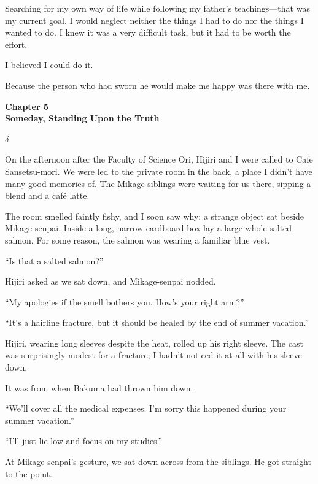 \documentclass[
    a4paper,
    12pt,
    twoside,
    openany,
    UTF8,
    fontset=windows
]{ctexbook}
\begin{document}
Searching for my own way of life while following my father's teachings---that was my current goal. I would neglect neither the things I had to do nor the things I wanted to do. I knew it was a very difficult task, but it had to be worth the effort.

I believed I could do it.

Because the person who had sworn he would make me happy was there with me.

\clearpage
\thispagestyle{plain}
\begin{center}
    \large\bfseries
    Chapter 5\\
    Someday, Standing Upon the Truth
\end{center}
\label{sec:ch5V3}
\vspace{1cm}

$\delta$

On the afternoon after the Faculty of Science Ori, Hijiri and I were called to Cafe Sansetsu-mori. We were led to the private room in the back, a place I didn't have many good memories of. The Mikage siblings were waiting for us there, sipping a blend and a café latte.

The room smelled faintly fishy, and I soon saw why: a strange object sat beside Mikage-senpai. Inside a long, narrow cardboard box lay a large whole salted salmon. For some reason, the salmon was wearing a familiar blue vest.

``Is that a salted salmon?''

Hijiri asked as we sat down, and Mikage-senpai nodded.

``My apologies if the smell bothers you. How's your right arm?''

``It's a hairline fracture, but it should be healed by the end of summer vacation.''

Hijiri, wearing long sleeves despite the heat, rolled up his right sleeve. The cast was surprisingly modest for a fracture; I hadn't noticed it at all with his sleeve down.

It was from when Bakuma had thrown him down.

``We'll cover all the medical expenses. I'm sorry this happened during your summer vacation.''

``I'll just lie low and focus on my studies.''

At Mikage-senpai's gesture, we sat down across from the siblings. He got straight to the point.
\end{document}
